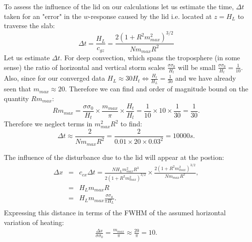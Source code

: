 \documentclass[12pt]{article}
\begin{document}
To assess the influence of the lid on our calculations let us estimate the time, $\Delta t $ taken for an "error" in the $w$-response caused by the lid i.e. located at $z=H_L$ to traverse the slab:
%
\begin{equation}
\Delta t = \frac{H_L}{c_{gz}} =\frac{2 (1 + R^2 m_{max}^2 )^{3/2}}{ N  m_{max} R^2 }
\end{equation}
%
Let us estimate $\Delta t$. For deep convection, which spans the troposphere (in some sense) the ratio of horizontal and vertical storm scales $\frac{\sigma \sigma_0}{ H_t}$ will be small $\frac{\sigma \sigma_0}{ H_t} = \frac{1}{10}$. Also, 
since for our converged data $H_L \approx 30 H_t \iff \frac{H_t}{H_L} = \frac{1}{30} $ and we have already seen that $m_{max} \approx 20$. Therefore we can find and order of magnitude
bound on the quantity $R m_{max}$:
%
\begin{equation}
R m_{max} = \frac{\sigma \sigma_0}{ H_t} \times \frac{m_{max}}{ \pi } \times \frac{H_t}{H_l} = \frac{1}{10} \times 10 \times \frac{1}{30} = \frac{1}{30}.
\end{equation}
%
Therefore we neglect terms in $m_{max}^2 R^2$ to find:
%
\begin{equation}
\Delta t  \approx \frac{2 }{ N  m_{max} R^2 } = \frac{2}{0.01 \times 20 \times 0.03^2} = 10000 s.
\end{equation}
%

The influence of the disturbance due to the lid will appear at the postion:
%
\begin{eqnarray}
\Delta x & = & c_{cx} \Delta t =  \frac{ N  H_L m_{max}^2 R^3 }{2 (1 + R^2 m_{max}^2 )^{3/2}} \times \frac{ 2 (1 + R^2 m_{max}^2 )^{3/2}}{ N  m_{max} R^2 }, \\ \nonumber
            & = & H_L m_{max} R\\ \nonumber
            & = & H_L m_{max}  \frac{\sigma \sigma_0}{ \pi H_L}.\\ \nonumber
\end{eqnarray}
%
Expressing this distance in terms of the FWHM of the assumed horizontal variation of heating:
%
\begin{eqnarray}
\frac{\Delta x }{\sigma \sigma_0 } = \frac{m_{max}}{ \pi } \approx \frac{20 }{ \pi} = 10   .
\end{eqnarray}
%
\end{document}
